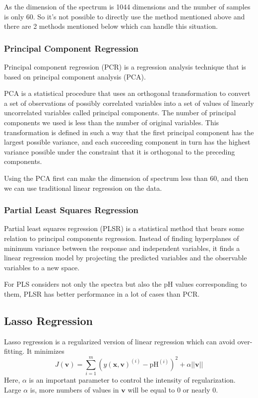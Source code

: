 \documentclass[a4paper]{article}
\newcommand{\bfv}{\mathbf{v}}
\newcommand{\bfx}{\mathbf{x}}
\begin{document}
As the dimension of the spectrum is 1044 dimensions and the number of samples is only 60. So it's not possible to directly use the method mentioned above and there are 2 methods mentioned below which can handle this situation.
\subsubsection{Principal Component Regression}
Principal component regression (PCR) is a regression analysis technique that is based on principal component analysis (PCA). 

PCA is a statistical procedure that uses an orthogonal transformation to convert a set of observations of possibly correlated variables into a set of values of linearly uncorrelated variables called principal components. The number of principal components we used is less than the number of original variables. This transformation is defined in such a way that the first principal component has the largest possible variance, and each succeeding component in turn has the highest variance possible under the constraint that it is orthogonal to the preceding components.

Using the PCA first can make the dimension of spectrum less than 60, and then we can use traditional linear regression on the data.
\subsubsection{Partial Least Squares Regression}
Partial least squares regression (PLSR) is a statistical method that bears some relation to principal components regression. Instead of finding hyperplanes of minimum variance between the response and independent variables, it finds a linear regression model by projecting the predicted variables and the observable variables to a new space.

For PLS considers not only the spectra but also the pH values corresponding to them, PLSR has better performance in a lot of cases than PCR.
\subsection{Lasso Regression}
Lasso regression is a regularized version of linear regression which can avoid over-fitting. It minimizes
\begin{equation}
J(\bfv)=\sum_{i=1}^m (y(\bfx,\bfv)^{(i)}-\mathrm{pH}^{(i)})^2+\alpha ||\bfv||
\end{equation}
Here, $\alpha$ is an important parameter to control the intensity of regularization. Large $\alpha$ is, more numbers of values in $\bfv$ will be equal to 0 or nearly 0.
\end{document}
